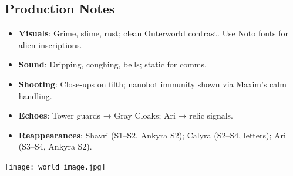 \documentclass[10pt,letterpaper]{article}
\begin{document}
\begin{paracol}{2}
\switchcolumn

\section{Production Notes}
\begin{itemize}
    \item \textbf{Visuals}: Grime, slime, rust; clean Outerworld contrast. Use Noto fonts for alien inscriptions.
    \item \textbf{Sound}: Dripping, coughing, bells; static for comms.
    \item \textbf{Shooting}: Close-ups on filth; nanobot immunity shown via Maxim’s calm handling.
    \item \textbf{Echoes}: Tower guards → Gray Cloaks; Ari → relic signals.
    \item \textbf{Reappearances}: Shavri (S1–S2, Ankyra S2); Calyra (S2–S4, letters); Ari (S3–S4, Ankyra S2).
\end{itemize}

\begin{center}
\texttt{[image: world\_image.jpg]} %
\end{center}

\end{paracol}
\end{document}
